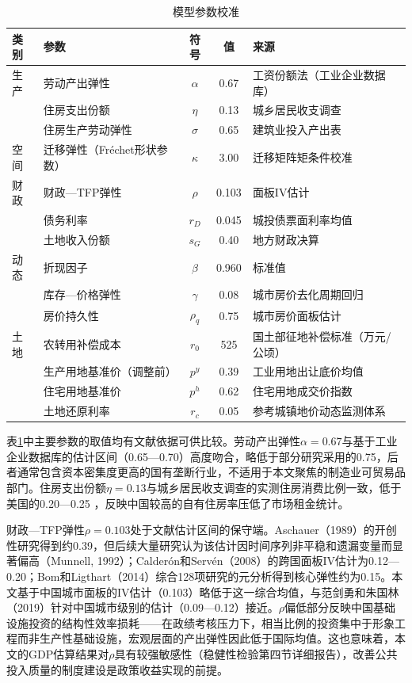 \documentclass[UTF8,a4paper,12pt]{ctexart}
\theoremstyle{plain}
\theoremstyle{definition}
\theoremstyle{remark}
\begin{document}
\begin{table}[htbp]
  \centering
  \caption{模型参数校准}
  \label{tab:params}
  \begin{tabular}{llccl}
    \toprule
    类别 & 参数 & 符号 & 值 & 来源 \\
    \midrule
    生产 & 劳动产出弹性      & $\alpha$    & 0.67  & 工资份额法（工业企业数据库） \\
         & 住房支出份额      & $\eta$      & 0.13  & 城乡居民收支调查 \\
         & 住房生产劳动弹性  & $\sigma$    & 0.65  & 建筑业投入产出表 \\
    \midrule
    空间 & 迁移弹性（Fréchet形状参数）& $\kappa$    & 3.00  & 迁移矩阵矩条件校准 \\
    \midrule
    财政 & 财政—TFP弹性      & $\rho$      & 0.103 & 面板IV估计 \\
         & 债务利率          & $r_D$       & 0.045 & 城投债票面利率均值 \\
         & 土地收入份额      & $s_G$       & 0.40  & 地方财政决算 \\
    \midrule
    动态 & 折现因子          & $\beta$     & 0.960 & 标准值 \\
         & 库存—价格弹性    & $\gamma$    & 0.08  & 城市房价去化周期回归 \\
         & 房价持久性        & $\rho_q$    & 0.75  & 城市房价面板估计 \\
    \midrule
    土地 & 农转用补偿成本    & $r_0$       & 525   & 国土部征地补偿标准（万元/公顷） \\
         & 生产用地基准价（调整前）& $p^y$  & 0.39  & 工业用地出让底价均值 \\
         & 住宅用地基准价    & $p^h$       & 0.62  & 住宅用地成交价指数 \\
         & 土地还原利率      & $r_c$       & 0.05  & 参考城镇地价动态监测体系 \\
    \bottomrule
  \end{tabular}
\end{table}

表\ref{tab:params}中主要参数的取值均有文献依据可供比较。劳动产出弹性$\alpha=0.67$与\citet{bai2016}基于工业企业数据库的估计区间（0.65—0.70）高度吻合，略低于部分研究采用的0.75，后者通常包含资本密集度更高的国有垄断行业，不适用于本文聚焦的制造业可贸易品部门。住房支出份额$\eta=0.13$与城乡居民收支调查的实测住房消费比例一致，低于美国的0.20—0.25 \citep{favilukis2017}，反映中国较高的自有住房率压低了市场租金统计。

财政—TFP弹性$\rho=0.103$处于文献估计区间的保守端。Aschauer（1989）的开创性研究得到约0.39，但后续大量研究认为该估计因时间序列非平稳和遗漏变量而显著偏高（Munnell, 1992）；Calderón和Servén（2008）的跨国面板IV估计为0.12—0.20；Bom和Ligthart（2014）综合128项研究的元分析得到核心弹性约为0.15。本文基于中国城市面板的IV估计（0.103）略低于这一综合均值，与范剑勇和朱国林（2019）针对中国城市级别的估计（0.09—0.12）接近。$\rho$偏低部分反映中国基础设施投资的结构性效率损耗——在政绩考核压力下，相当比例的投资集中于形象工程而非生产性基础设施，宏观层面的产出弹性因此低于国际均值。这也意味着，本文的GDP估算结果对$\rho$具有较强敏感性（稳健性检验第四节详细报告），改善公共投入质量的制度建设是政策收益实现的前提。
\end{document}
